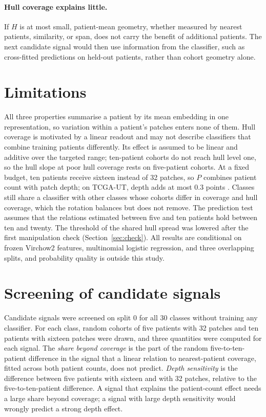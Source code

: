 \documentclass[11pt]{article}
\begin{document}
\paragraph{Hull coverage explains little.}
If $H$ is at most small, patient-mean geometry, whether measured by nearest patients, similarity, or span, does not carry the benefit of additional patients. The next candidate signal would then use information from the classifier, such as cross-fitted predictions on held-out patients, rather than cohort geometry alone.

\section{Limitations}
\label{sec:limitations}
All three properties summarise a patient by its mean embedding in one representation, so variation within a patient's patches enters none of them. Hull coverage is motivated by a linear readout and may not describe classifiers that combine training patients differently. Its effect is assumed to be linear and additive over the targeted range; ten-patient cohorts do not reach hull level one, so the hull slope at poor hull coverage rests on five-patient cohorts. At a fixed budget, ten patients receive sixteen instead of 32 patches, so $P$ combines patient count with patch depth; on TCGA-UT, depth adds at most 0.3 points \citep{queisler2026effectiveSupport}. Classes still share a classifier with other classes whose cohorts differ in coverage and hull coverage, which the rotation balances but does not remove. The prediction test assumes that the relations estimated between five and ten patients hold between ten and twenty. The threshold of the shared hull spread was lowered after the first manipulation check (Section~\ref{sec:check}). All results are conditional on frozen Virchow2 features, multinomial logistic regression, and three overlapping splits, and probability quality is outside this study.

\appendix
\section{Screening of candidate signals}
\label{app:screen}
Candidate signals were screened on split 0 for all 30 classes without training any classifier. For each class, random cohorts of five patients with 32 patches and ten patients with sixteen patches were drawn, and three quantities were computed for each signal. The \emph{share beyond coverage} is the part of the random five-to-ten-patient difference in the signal that a linear relation to nearest-patient coverage, fitted across both patient counts, does not predict. \emph{Depth sensitivity} is the difference between five patients with sixteen and with 32 patches, relative to the five-to-ten-patient difference. A signal that explains the patient-count effect needs a large share beyond coverage; a signal with large depth sensitivity would wrongly predict a strong depth effect.
\end{document}
